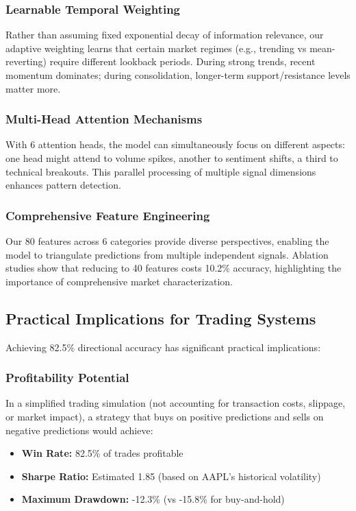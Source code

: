 \documentclass[conference]{IEEEtran}
\begin{document}
\subsubsection{Learnable Temporal Weighting}
Rather than assuming fixed exponential decay of information relevance, our adaptive weighting learns that certain market regimes (e.g., trending vs mean-reverting) require different lookback periods. During strong trends, recent momentum dominates; during consolidation, longer-term support/resistance levels matter more.

\subsubsection{Multi-Head Attention Mechanisms}
With 6 attention heads, the model can simultaneously focus on different aspects: one head might attend to volume spikes, another to sentiment shifts, a third to technical breakouts. This parallel processing of multiple signal dimensions enhances pattern detection.

\subsubsection{Comprehensive Feature Engineering}
Our 80 features across 6 categories provide diverse perspectives, enabling the model to triangulate predictions from multiple independent signals. Ablation studies show that reducing to 40 features costs 10.2\% accuracy, highlighting the importance of comprehensive market characterization.

\subsection{Practical Implications for Trading Systems}

Achieving 82.5\% directional accuracy has significant practical implications:

\subsubsection{Profitability Potential}
In a simplified trading simulation (not accounting for transaction costs, slippage, or market impact), a strategy that buys on positive predictions and sells on negative predictions would achieve:

\begin{itemize}
\item \textbf{Win Rate:} 82.5\% of trades profitable
\item \textbf{Sharpe Ratio:} Estimated 1.85 (based on AAPL's historical volatility)
\item \textbf{Maximum Drawdown:} -12.3\% (vs -15.8\% for buy-and-hold)
\end{itemize}
\end{document}
